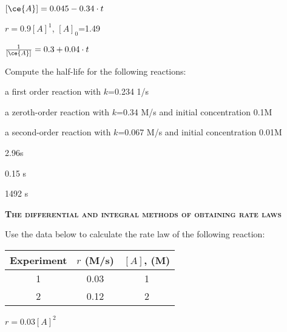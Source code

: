 \documentclass[main.tex]{subfiles}
\begin{document}
\begin{multicols*}{2}
\begin{solution}
\begin{inparaenum}[(a)]
\item $[\ce{A}] =0.045 -0.34\cdot t $	 	%
\item 	   $r=0.9[A]^1$, $[A]_0$=1.49   %
\item $\frac{1}{[\ce{A}]}=0.3+0.04\cdot t $	%
\end{inparaenum}\hspace{0.1cm}\end{solution}%


\begin{question}[ID=\the\value{numA}]
Compute the half-life for the following reactions:
\begin{inparaenum}[(a)]
\item a first order reaction with $k$=0.234 1/s	 	%
\item a zeroth-order reaction with $k$=0.34 M/s	 and initial concentration 0.1M	%
\item a second-order reaction with $k$=0.067 M/s	 and initial concentration 0.01M	%
\end{inparaenum}
\end{question}
\begin{solution}
\begin{inparaenum}[(a)]
\item  2.96s 
\item  0.15 s
\item  1492 s
\end{inparaenum}\hspace{0.1cm}\end{solution}%




{\raggedright\textsc{\textbf{The differential and integral methods of obtaining rate laws }}\par}


\begin{question}[ID=\the\value{numA}]
Use the data below to calculate the rate law of the following reaction: \begin{center}\end{center}
\begin{center}\begin{tabular}[t]{  c c  c   }
\toprule
 Experiment &$r$ (M/s)	&$[A]$, (M) \\
\midrule
1&	0.03&	1\\
2&	0.12 &2	\\
\bottomrule
\end{tabular}\end{center}
\end{question}
\begin{solution}
$r=0.03[A]^2$
\hspace{0.1cm}\end{solution}%



\end{multicols*}
\end{document}
